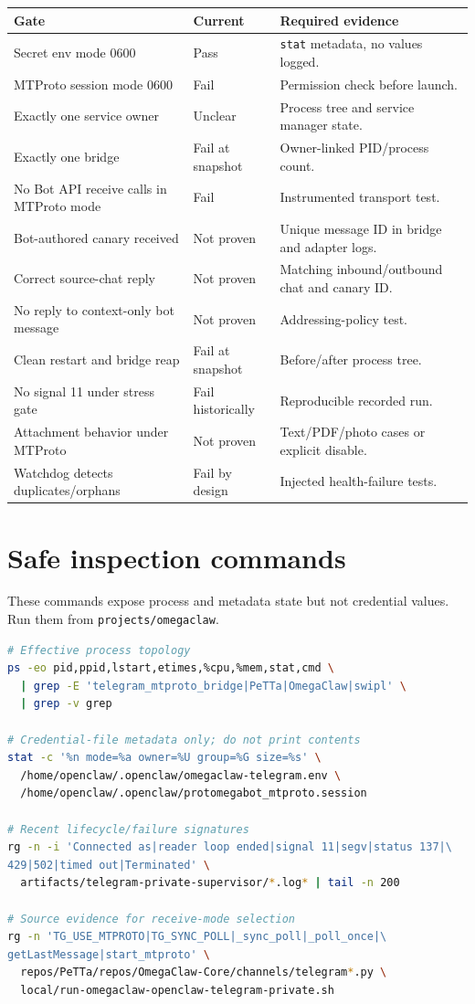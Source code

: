\documentclass[10pt]{article}
\newcommand{\code}[1]{\texttt{#1}}
\begin{document}
\begin{longtable}{p{}p{}p{}}
\toprule
Gate & Current & Required evidence \\
\midrule
\endhead
Secret env mode 0600 & Pass & \code{stat} metadata, no values logged. \\
MTProto session mode 0600 & Fail & Permission check before launch. \\
Exactly one service owner & Unclear & Process tree and service manager state. \\
Exactly one bridge & Fail at snapshot & Owner-linked PID/process count. \\
No Bot API receive calls in MTProto mode & Fail & Instrumented transport test. \\
Bot-authored canary received & Not proven & Unique message ID in bridge and adapter logs. \\
Correct source-chat reply & Not proven & Matching inbound/outbound chat and canary ID. \\
No reply to context-only bot message & Not proven & Addressing-policy test. \\
Clean restart and bridge reap & Fail at snapshot & Before/after process tree. \\
No signal 11 under stress gate & Fail historically & Reproducible recorded run. \\
Attachment behavior under MTProto & Not proven & Text/PDF/photo cases or explicit disable. \\
Watchdog detects duplicates/orphans & Fail by design & Injected health-failure tests. \\
\bottomrule
\end{longtable}

\section{Safe inspection commands}

These commands expose process and metadata state but not credential values. Run them from \code{projects/omegaclaw}.

\begin{lstlisting}[language=bash]
# Effective process topology
ps -eo pid,ppid,lstart,etimes,%cpu,%mem,stat,cmd \
  | grep -E 'telegram_mtproto_bridge|PeTTa|OmegaClaw|swipl' \
  | grep -v grep

# Credential-file metadata only; do not print contents
stat -c '%n mode=%a owner=%U group=%G size=%s' \
  /home/openclaw/.openclaw/omegaclaw-telegram.env \
  /home/openclaw/.openclaw/protomegabot_mtproto.session

# Recent lifecycle/failure signatures
rg -n -i 'Connected as|reader loop ended|signal 11|segv|status 137|\
429|502|timed out|Terminated' \
  artifacts/telegram-private-supervisor/*.log* | tail -n 200

# Source evidence for receive-mode selection
rg -n 'TG_USE_MTPROTO|TG_SYNC_POLL|_sync_poll|_poll_once|\
getLastMessage|start_mtproto' \
  repos/PeTTa/repos/OmegaClaw-Core/channels/telegram*.py \
  local/run-omegaclaw-openclaw-telegram-private.sh
\end{lstlisting}
\end{document}
